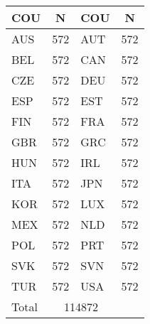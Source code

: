 \begin{table}[H]
\footnotesize
\centering \caption{N. obs /  COU in  estimation   sample }
{
\def\sym#1{\ifmmode^{#1}\else\(^{#1}\)\fi}
\begin{longtable}{l*{1}{c}l*{1}{c}}
\toprule\endfirsthead\midrule\endhead\midrule\endfoot\endlastfoot
   COU             &\multicolumn{1}{c}{N}&  COU             &\multicolumn{1}{c}{N}\\
\midrule
AUS         &         572     &
AUT         &         572            \\ \addlinespace
BEL         &         572     &
CAN         &         572        \\ \addlinespace
CZE         &         572     &
DEU         &         572        \\ \addlinespace
ESP         &         572     &
EST         &         572        \\ \addlinespace
FIN         &         572     &
FRA         &         572        \\ \addlinespace
GBR         &         572     &
GRC         &         572        \\ \addlinespace
HUN         &         572     &
IRL         &         572        \\ \addlinespace
ITA         &         572     &
JPN         &         572        \\ \addlinespace
KOR         &         572     &
LUX         &         572        \\ \addlinespace
MEX         &         572     &
NLD         &         572        \\ \addlinespace
POL         &         572     &
PRT         &         572        \\ \addlinespace
SVK         &         572     &
SVN         &         572        \\ \addlinespace
TUR         &         572     &
USA         &         572        \\ \addlinespace
Total       &        \multicolumn{2}{c}{114872}         \\
\bottomrule
\end{longtable}
}
\end{table}

